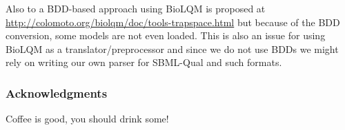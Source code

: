 \documentclass[runningheads]{llncs}
\begin{document}
Also to a BDD-based approach using BioLQM is proposed at \url{http://colomoto.org/biolqm/doc/tools-trapspace.html} but because of the BDD conversion, some models are not even loaded.
This is also an issue for using BioLQM as a translator/preprocessor and since we do not use BDDs we might rely on writing our own parser for SBML-Qual and such formats.

\subsubsection{Acknowledgments}
Coffee is good, you should drink some!



\end{document}
